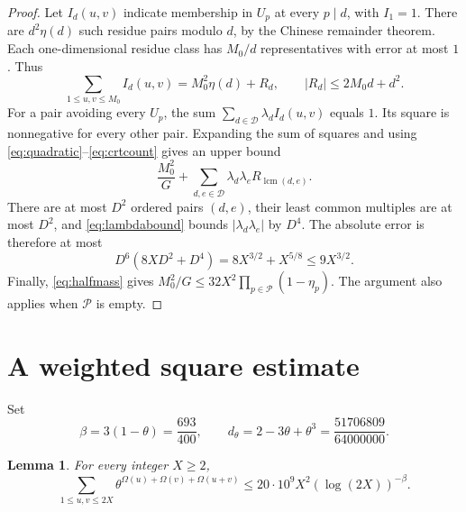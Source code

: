\documentclass[11pt]{amsart}
\newtheorem{lemma}[theorem]{Lemma}
\theoremstyle{definition}
\theoremstyle{remark}
\numberwithin{equation}{section}
\newcommand{\Om}{\Omega}
\DeclareMathOperator{\lcm}{lcm}
\begin{document}
\begin{proof}
Let $I_d(u,v)$ indicate membership in $U_p$ at every $p\mid d$, with $I_1=1$.
There are $d^2\eta(d)$ such residue pairs modulo $d$, by the Chinese remainder theorem.
Each one-dimensional residue class has $M_0/d$ representatives with error at most $1$.
Thus
\begin{equation}\label{eq:crtcount}
\sum_{1\le u,v\le M_0}I_d(u,v)=M_0^2\eta(d)+R_d,
\qquad |R_d|\le2M_0d+d^2.
\end{equation}
For a pair avoiding every $U_p$, the sum $\sum_{d\in\mathcal D}\lambda_dI_d(u,v)$ equals $1$.
Its square is nonnegative for every other pair.
Expanding the sum of squares and using \eqref{eq:quadratic}--\eqref{eq:crtcount} gives an upper bound
\[
\frac{M_0^2}{G}
+\sum_{d,e\in\mathcal D}\lambda_d\lambda_eR_{\lcm(d,e)}.
\]
There are at most $D^2$ ordered pairs $(d,e)$, their least common multiples are at most $D^2$, and \eqref{eq:lambdabound} bounds $|\lambda_d\lambda_e|$ by $D^4$.
The absolute error is therefore at most
\[
D^6(8XD^2+D^4)=8X^{3/2}+X^{5/8}\le9X^{3/2}.
\]
Finally, \eqref{eq:halfmass} gives
$M_0^2/G\le32X^2\prod_{p\in\mathcal P}(1-\eta_p)$.
The argument also applies when $\mathcal P$ is empty.
\end{proof}

\section{A weighted square estimate}\label{sec:square}

Set
\begin{equation}\label{eq:beta}
\beta=3(1-\theta)=\frac{693}{400},
\qquad d_\theta=2-3\theta+\theta^3=\frac{51706809}{64000000}.
\end{equation}

\begin{lemma}\label{lem:square}
For every integer $X\ge2$,
\begin{equation}\label{eq:square}
\sum_{1\le u,v\le2X}\theta^{\Om(u)+\Om(v)+\Om(u+v)}
\le20\cdot10^9X^2(\log(2X))^{-\beta}.
\end{equation}
\end{lemma}
\end{document}
